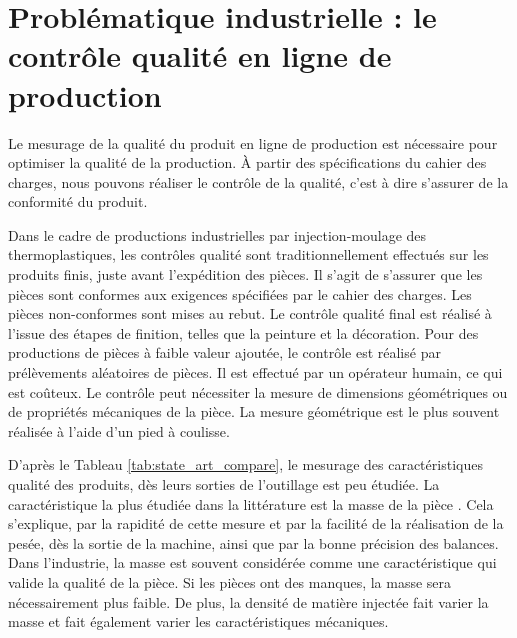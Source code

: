 
\section{Problématique industrielle : le contrôle qualité en ligne de production} \label{sec:research_objectives}
Le mesurage de la qualité du produit en ligne de production est nécessaire pour optimiser la qualité de la production.
À partir des spécifications du cahier des charges, nous pouvons réaliser le contrôle de la qualité, c'est à dire s'assurer de la conformité du produit.

Dans le cadre de productions industrielles par injection-moulage des thermoplastiques, les contrôles qualité sont traditionnellement effectués sur les produits finis, juste avant l'expédition des pièces.
Il s'agit de s’assurer que les pièces sont conformes aux exigences spécifiées par le cahier des charges.
Les pièces non-conformes sont mises au rebut.
Le contrôle qualité final est réalisé à l’issue des étapes de finition, telles que la peinture et la décoration.
Pour des productions de pièces à faible valeur ajoutée, le contrôle est réalisé par prélèvements aléatoires de pièces.
Il est effectué par un opérateur humain, ce qui est coûteux.
Le contrôle peut nécessiter la mesure de dimensions géométriques ou de propriétés mécaniques de la pièce.
La mesure géométrique est le plus souvent réalisée à l'aide d'un pied à coulisse.

D'après le Tableau \ref{tab:state_art_compare}, le mesurage des caractéristiques qualité des produits, dès leurs sorties de l'outillage est peu étudiée.
La caractéristique la plus étudiée dans la littérature est la masse de la pièce \cite{schnerr-haselbarth_automation_2000, fournier_conduite_2006, michaeli_online_2009}.
Cela s'explique, par la rapidité de cette mesure et par la facilité de la réalisation de la pesée, dès la sortie de la machine, ainsi que par la bonne précision des balances.
Dans l'industrie, la masse est souvent considérée comme une caractéristique qui valide la qualité de la pièce.
Si les pièces ont des manques, la masse sera nécessairement plus faible.
De plus, la densité de matière injectée fait varier la masse et fait également varier les caractéristiques mécaniques.

